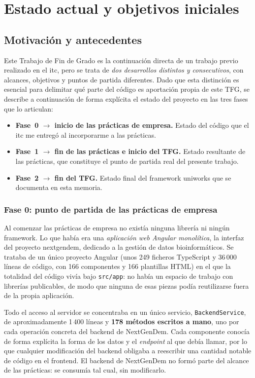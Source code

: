 \chapter{Estado actual y objetivos iniciales}

\section{Motivación y antecedentes}
Este Trabajo de Fin de Grado es la continuación directa de un trabajo previo
realizado en el \gls{itc}, pero se trata de \emph{dos desarrollos distintos y
consecutivos}, con alcances, objetivos y puntos de partida diferentes. Dado que
esta distinción es esencial para delimitar qué parte del código es aportación
propia de este TFG, se describe a continuación de forma explícita el estado del
proyecto en las tres fases que lo articulan:

\renewcommand{\labelitemi}{\textbullet}
\begin{itemize}
  \item \textbf{Fase~0 $\rightarrow$ inicio de las prácticas de empresa.} Estado del
  código que el \gls{itc} me entregó al incorporarme a las prácticas.
  \item \textbf{Fase~1 $\rightarrow$ fin de las prácticas e inicio del TFG.} Estado
  resultante de las prácticas, que constituye el punto de partida real del
  presente trabajo.
  \item \textbf{Fase~2 $\rightarrow$ fin del TFG.} Estado final del framework
  \gls{uniworks} que se documenta en esta memoria.
\end{itemize}

\subsection{Fase 0: punto de partida de las prácticas de empresa}
Al comenzar las prácticas de empresa no existía ninguna librería ni ningún
framework. Lo que había era una \emph{aplicación web Angular monolítica}, la
interfaz del proyecto \gls{nextgendem}, dedicado a la gestión de datos
bioinformáticos. Se trataba de un único proyecto Angular (unos 249 ficheros
TypeScript y 36\,000 líneas de código, con 166 componentes y 166 plantillas
HTML) en el que la totalidad del código vivía bajo \texttt{src/app}: no había
un espacio de trabajo con librerías publicables, de modo que ninguna de esas
piezas podía reutilizarse fuera de la propia aplicación.

Todo el acceso al servidor se concentraba en un único servicio,
\texttt{Backend\allowbreak Service}, de aproximadamente 1\,400 líneas y
\textbf{178 métodos escritos a mano}, uno por cada operación concreta del
backend de NextGenDem. Cada componente conocía de forma explícita la forma de
los datos y el \emph{endpoint} al que debía llamar, por lo que cualquier
modificación del backend obligaba a reescribir una cantidad notable de código
en el frontend. El backend de NextGenDem no formó parte del alcance de las
prácticas: se consumía tal cual, sin modificarlo.

